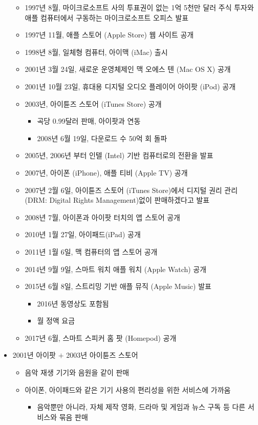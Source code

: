 \begin{itemize}
\begin{itemize}
	\item 1997년 8월, 마이크로소프트 사의 투표권이 없는 1억 5천만 달러 주식 투자와 애플 컴퓨터에서 구동하는 마이크로소프트 오피스 발표
	\item 1997년 11월, 애플 스토어 (Apple Store) 웹 사이트 공개
	\item 1998년 8월, 일체형 컴퓨터, 아이맥 (iMac) 출시
	\item 2001년 3월 24일, 새로운 운영체제인 맥 오에스 텐 (Mac OS X) 공개
	\item 2001년 10월 23일, 휴대용 디지털 오디오 플레이어 아이팟 (iPod) 공개
	\item 2003년, 아이튠즈 스토어 (iTunes Store) 공개
		\begin{itemize}
		\item 곡당 0.99달러 판매, 아이팟과 연동
		\item 2008년 6월 19일, 다운로드 수 50억 회 돌파 
		\end{itemize}
	\item 2005년, 2006년 부터 인텔 (Intel) 기반 컴퓨터로의 전환을 발표
	\item 2007년, 아이폰 (iPhone), 애플 티비 (Apple TV) 공개
	\item 2007년 2월 6일, 아이튠즈 스토어 (iTunes Store)에서 디지털 권리 관리 (DRM: Digital Rights Management)없이 판매하겠다고 발표
	\item 2008년 7월, 아이폰과 아이팟 터치의 앱 스토어 공개
	\item 2010년 1월 27일, 아이패드(iPad) 공개
	\item 2011년 1월 6일, 맥 컴퓨터의 앱 스토어 공개
	\item 2014년 9월 9일, 스마트 워치 애플 워치 (Apple Watch) 공개
	\item 2015년 6월 8일, 스트리밍 기반 애플 뮤직 (Apple Music) 발표
		\begin{itemize}
		\item 2016년 동영상도 포함됨
		\item 월 정액 요금
		\end{itemize}
	\item 2017년 6월, 스마트 스피커 홈 팟 (Homepod) 공개
	\end{itemize}
\item 2001년 아이팟 $+$ 2003년 아이튠즈 스토어	
	\begin{itemize}
	\item 음악 재생 기기와 음원을 같이 판매	
	\item 아이폰, 아이패드와 같은 기기 사용의 편리성을 위한 서비스에 가까움
		\begin{itemize}
		\item 음악뿐만 아니라, 자체 제작 영화, 드라마 및 게임과 뉴스 구독 등 다른 서비스와 묶음 판매
		\end{itemize}	
	\end{itemize}
	

\end{itemize}

